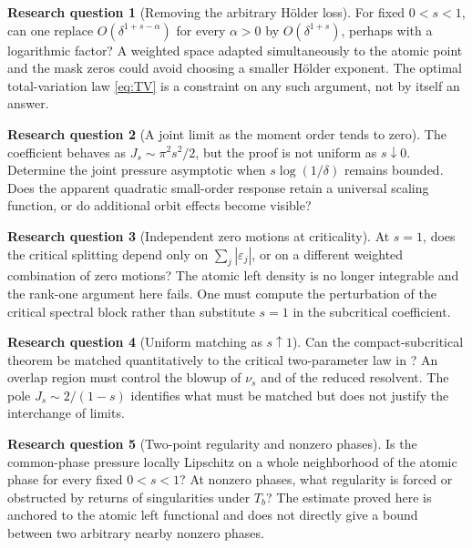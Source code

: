 \documentclass[11pt,a4paper]{article}
\numberwithin{equation}{section}
\theoremstyle{definition}
\newtheorem{question}{Research question}
\theoremstyle{remark}
\begin{document}
\begin{question}[Removing the arbitrary H\"older loss]
For fixed $0<s<1$, can one replace
$O(\delta^{1+s-\alpha})$ for every $\alpha>0$ by
$O(\delta^{1+s})$, perhaps with a logarithmic factor?
A weighted space adapted simultaneously to the atomic point and the
mask zeros could avoid choosing a smaller H\"older exponent. The
optimal total-variation law \cref{eq:TV} is a constraint on any such
argument, not by itself an answer.
\end{question}

\begin{question}[A joint limit as the moment order tends to zero]
The coefficient behaves as $J_s\sim\pi^2s^2/2$, but the proof is not
uniform as $s\downarrow0$. Determine the joint pressure asymptotic
when $s\log(1/\delta)$ remains bounded. Does the apparent quadratic
small-order response retain a universal scaling function, or do
additional orbit effects become visible?
\end{question}

\begin{question}[Independent zero motions at criticality]
At $s=1$, does the critical splitting depend only on
$\sum_j|\varepsilon_j|$, or on a different weighted combination of
zero motions? The atomic left density is no longer integrable and the
rank-one argument here fails. One must compute the perturbation of
the critical spectral block rather than substitute $s=1$ in the
subcritical coefficient.
\end{question}

\begin{question}[Uniform matching as $s\uparrow1$]
Can the compact-subcritical theorem be matched quantitatively to the
critical two-parameter law in \cite{CriticalRepo}? An overlap region
must control the blowup of $\nu_s$ and of the reduced resolvent.
The pole $J_s\sim2/(1-s)$ identifies what must be matched but does not
justify the interchange of limits.
\end{question}

\begin{question}[Two-point regularity and nonzero phases]
Is the common-phase pressure locally Lipschitz on a whole neighborhood
of the atomic phase for every fixed $0<s<1$? At nonzero phases, what
regularity is forced or obstructed by returns of singularities under
$T_b$? The estimate proved here is anchored to the atomic left
functional and does not directly give a bound between two arbitrary
nearby nonzero phases.
\end{question}
\end{document}
